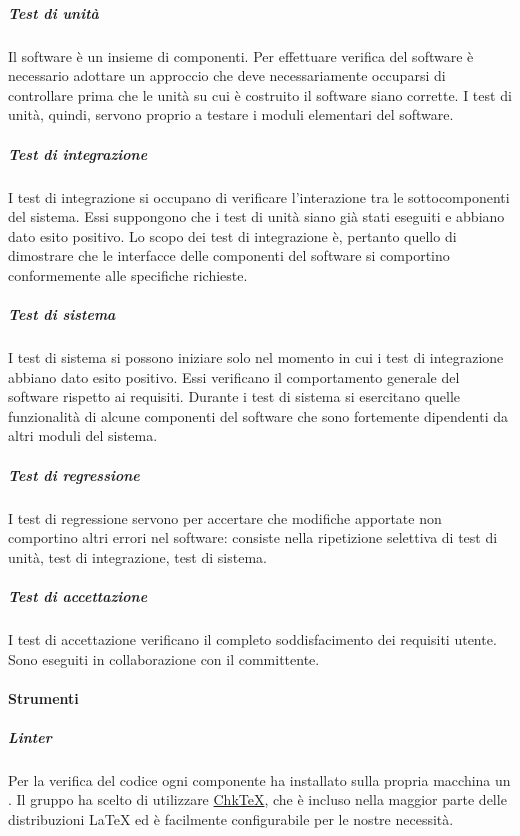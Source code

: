 \documentclass[../norme-di-progetto.tex]{subfiles}
\begin{document}
\subparagraph{Test di unità}%
\label{subp:test_di_unita}
Il software è un insieme di componenti. Per effettuare verifica del software è necessario adottare un approccio  che deve necessariamente occuparsi di controllare prima che le unità su cui è costruito il software siano corrette. I test di unità, quindi, servono proprio a testare i moduli elementari del software.

\subparagraph{Test di integrazione}%
\label{subp:test_di_integrazione}
I test di integrazione si occupano di verificare l'interazione tra le sottocomponenti del sistema. Essi suppongono che i test di unità siano già stati eseguiti e abbiano dato esito positivo. Lo scopo dei test di integrazione è, pertanto quello di dimostrare che le interfacce delle componenti del software si comportino conformemente alle specifiche richieste.

\subparagraph{Test di sistema}%
\label{test_di_sistemaa}
I test di sistema si possono iniziare solo nel momento in cui i test di integrazione abbiano dato esito positivo. Essi verificano il comportamento generale del software rispetto ai requisiti. Durante i test di sistema si esercitano quelle funzionalità di alcune componenti del software che sono fortemente dipendenti da altri moduli del sistema.

\subparagraph{Test di regressione}%
\label{test_di_regressione}
I test di regressione servono per accertare che modifiche apportate non comportino altri errori nel software: consiste nella ripetizione selettiva di test di unità, test di integrazione, test di sistema.

\subparagraph{Test di accettazione}%
\label{test_di_accettazione}
I test di accettazione verificano il completo soddisfacimento dei requisiti utente. Sono eseguiti in collaborazione con il committente.

\paragraph{Strumenti}%
\label{par:verifica/descrizione/strumenti}

\subparagraph{Linter}%
\label{subp:linter}

Per la verifica del codice ogni componente ha installato sulla propria macchina un . Il gruppo ha scelto di utilizzare \href{https://www.nongnu.org/chktex/}{Chk\TeX}, che è incluso nella maggior parte delle distribuzioni \LaTeX{} ed è facilmente configurabile per le nostre necessità.
\end{document}
